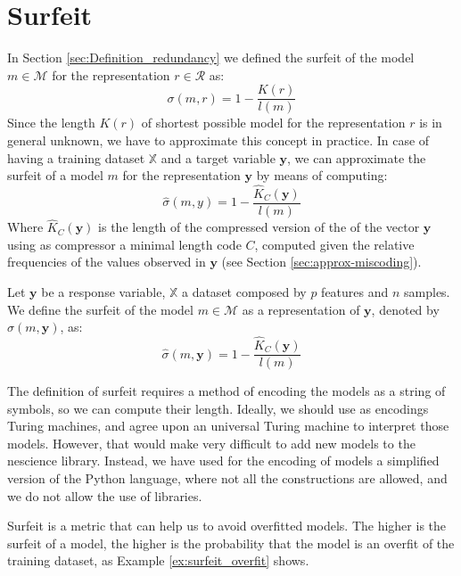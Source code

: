 \section{Surfeit}
\label{sec:machine_learning_surfeit}

In Section \ref{sec:Definition_redundancy} we defined the surfeit of the model $m \in \mathcal{M}$ for the representation $r \in \mathcal{R}$ as:
\[
\sigma (m, r) = 1 - \frac{K(r)}{l(m)}
\]
Since the length $K(r)$ of shortest possible model for the representation $r$ is in general unknown, we have to approximate this concept in practice. In case of having a training dataset $\mathbb{X}$ and a target variable $\mathbf{y}$, we can approximate the surfeit of a model $m$ for the representation $\mathbf{y}$ by means of computing:
\[
\hat\sigma(m, y) = 1 - \frac{\hat{K}_C(\mathbf{y})}{l(m)}
\]
Where $\hat{K}_C(\mathbf{y})$ is the length of the compressed version of the of the vector $\mathbf{y}$ using as compressor a minimal length code $C$, computed given the relative frequencies of the values observed in $\mathbf{y}$ (see Section \ref{sec:approx-miscoding}).

\begin{definition}
Let $\mathbf{y}$ be a response variable, $\mathbb{X}$ a dataset composed by $p$ features and $n$ samples. We define the surfeit of the model $m \in \mathcal{M}$ as a representation of $\mathbf{y}$, denoted by $\hat\sigma(m, \mathbf{y})$, as:
\[
\hat\sigma(m, \mathbf{y}) = 1 - \frac{\hat{K}_C(\mathbf{y})}{l(m)}
\]
\end{definition}

The definition of surfeit requires a method of encoding the models as a string of symbols, so we can compute their length. Ideally, we should use as encodings Turing machines, and agree upon an universal Turing machine to interpret those models. However, that would make very difficult to add new models to the nescience library. Instead, we have used for the encoding of models a simplified version of the Python language, where not all the constructions are allowed, and we do not allow the use of libraries.

Surfeit is a metric that can help us to avoid overfitted models. The higher is the surfeit of a model, the higher is the probability that the model is an overfit of the training dataset, as Example \ref{ex:surfeit_overfit} shows.

